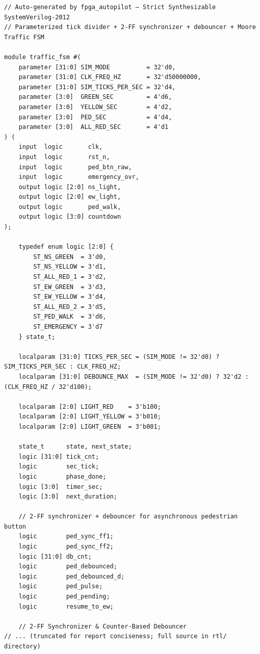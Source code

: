 \documentclass[11pt,a4paper]{article}
\begin{document}
\begin{lstlisting}
// Auto-generated by fpga_autopilot — Strict Synthesizable SystemVerilog-2012
// Parameterized tick divider + 2-FF synchronizer + debouncer + Moore Traffic FSM

module traffic_fsm #(
    parameter [31:0] SIM_MODE          = 32'd0,
    parameter [31:0] CLK_FREQ_HZ       = 32'd50000000,
    parameter [31:0] SIM_TICKS_PER_SEC = 32'd4,
    parameter [3:0]  GREEN_SEC         = 4'd6,
    parameter [3:0]  YELLOW_SEC        = 4'd2,
    parameter [3:0]  PED_SEC           = 4'd4,
    parameter [3:0]  ALL_RED_SEC       = 4'd1
) (
    input  logic       clk,
    input  logic       rst_n,
    input  logic       ped_btn_raw,
    input  logic       emergency_ovr,
    output logic [2:0] ns_light,
    output logic [2:0] ew_light,
    output logic       ped_walk,
    output logic [3:0] countdown
);

    typedef enum logic [2:0] {
        ST_NS_GREEN  = 3'd0,
        ST_NS_YELLOW = 3'd1,
        ST_ALL_RED_1 = 3'd2,
        ST_EW_GREEN  = 3'd3,
        ST_EW_YELLOW = 3'd4,
        ST_ALL_RED_2 = 3'd5,
        ST_PED_WALK  = 3'd6,
        ST_EMERGENCY = 3'd7
    } state_t;

    localparam [31:0] TICKS_PER_SEC = (SIM_MODE != 32'd0) ? SIM_TICKS_PER_SEC : CLK_FREQ_HZ;
    localparam [31:0] DEBOUNCE_MAX  = (SIM_MODE != 32'd0) ? 32'd2 : (CLK_FREQ_HZ / 32'd100);

    localparam [2:0] LIGHT_RED    = 3'b100;
    localparam [2:0] LIGHT_YELLOW = 3'b010;
    localparam [2:0] LIGHT_GREEN  = 3'b001;

    state_t      state, next_state;
    logic [31:0] tick_cnt;
    logic        sec_tick;
    logic        phase_done;
    logic [3:0]  timer_sec;
    logic [3:0]  next_duration;

    // 2-FF synchronizer + debouncer for asynchronous pedestrian button
    logic        ped_sync_ff1;
    logic        ped_sync_ff2;
    logic [31:0] db_cnt;
    logic        ped_debounced;
    logic        ped_debounced_d;
    logic        ped_pulse;
    logic        ped_pending;
    logic        resume_to_ew;

    // 2-FF Synchronizer & Counter-Based Debouncer
// ... (truncated for report conciseness; full source in rtl/ directory)
\end{lstlisting}
\end{document}
